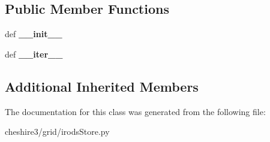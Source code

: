 \subsection*{Public Member Functions}
\begin{DoxyCompactItemize}
\item 
\hypertarget{classcheshire3_1_1grid_1_1irods_store_1_1_irods_object_store_a0a711284cb448ea7d1356d22018766b8}{def {\bfseries \-\_\-\-\_\-init\-\_\-\-\_\-}}\label{classcheshire3_1_1grid_1_1irods_store_1_1_irods_object_store_a0a711284cb448ea7d1356d22018766b8}

\item 
\hypertarget{classcheshire3_1_1grid_1_1irods_store_1_1_irods_object_store_aa387fee72519e2c8f9ead2ff5acf1a0e}{def {\bfseries \-\_\-\-\_\-iter\-\_\-\-\_\-}}\label{classcheshire3_1_1grid_1_1irods_store_1_1_irods_object_store_aa387fee72519e2c8f9ead2ff5acf1a0e}

\end{DoxyCompactItemize}
\subsection*{Additional Inherited Members}


The documentation for this class was generated from the following file\-:\begin{DoxyCompactItemize}
\item 
cheshire3/grid/irods\-Store.\-py\end{DoxyCompactItemize}
